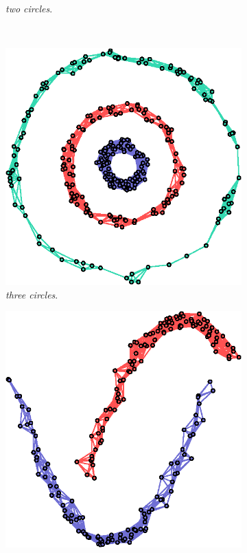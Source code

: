 \begin{figure}[!htb]
\begin{subfigure}[b]{0.23\textwidth}
      \caption{\textit{two circles}.}
    \end{subfigure}
    ~
    \begin{subfigure}[b]{0.23\textwidth}
      \includegraphics[width=\textwidth]{clusters/latex/figures/circles3.eps}
      \caption{\textit{three circles}.}
    \end{subfigure}
    \begin{subfigure}[b]{0.23\textwidth}
      \includegraphics[width=\textwidth]{clusters/latex/figures/worms.eps}

\end{subfigure}
\end{figure}
